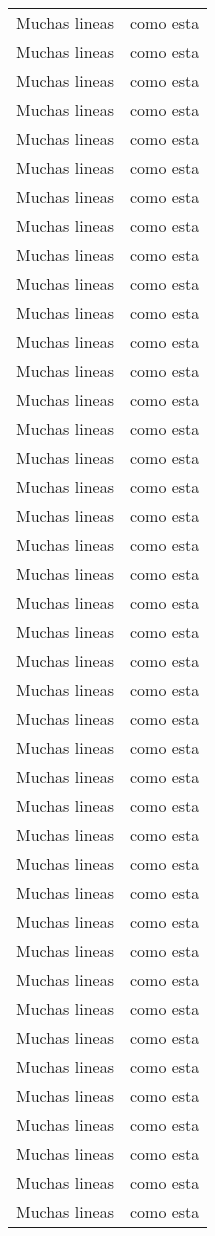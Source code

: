 \documentclass[12pt]{article}
\begin{document}
\begin{longtable}[c]{| c | c |}
 Muchas lineas & como esta\\
 Muchas lineas & como esta\\
 Muchas lineas & como esta\\
 Muchas lineas & como esta\\
 Muchas lineas & como esta\\
 Muchas lineas & como esta\\
 Muchas lineas & como esta\\
 Muchas lineas & como esta\\
 Muchas lineas & como esta\\
 Muchas lineas & como esta\\
 Muchas lineas & como esta\\
 Muchas lineas & como esta\\
 Muchas lineas & como esta\\
 Muchas lineas & como esta\\
 Muchas lineas & como esta\\
 Muchas lineas & como esta\\
 Muchas lineas & como esta\\
 Muchas lineas & como esta\\
 Muchas lineas & como esta\\
 Muchas lineas & como esta\\
 Muchas lineas & como esta\\
 Muchas lineas & como esta\\
 Muchas lineas & como esta\\
 Muchas lineas & como esta\\
 Muchas lineas & como esta\\
 Muchas lineas & como esta\\
 Muchas lineas & como esta\\
 Muchas lineas & como esta\\
 Muchas lineas & como esta\\
 Muchas lineas & como esta\\
 Muchas lineas & como esta\\
 Muchas lineas & como esta\\
 Muchas lineas & como esta\\
 Muchas lineas & como esta\\
 Muchas lineas & como esta\\
 Muchas lineas & como esta\\
 Muchas lineas & como esta\\
 Muchas lineas & como esta\\
 Muchas lineas & como esta\\
 Muchas lineas & como esta\\
 Muchas lineas & como esta\\
 Muchas lineas & como esta\\
 \end{longtable}
\end{document}

